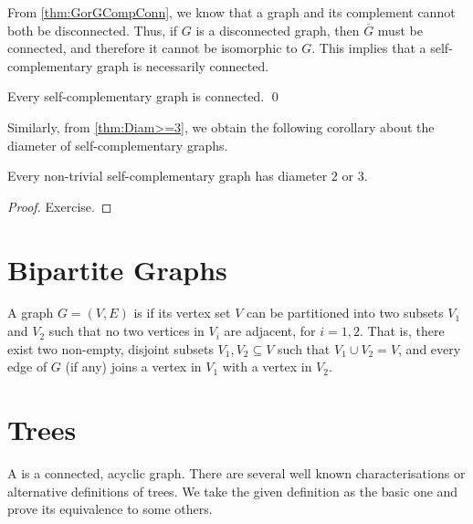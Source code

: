 From \cref{thm:GorGCompConn}, we know that a graph and its complement cannot both be disconnected. Thus, if $G$ is a disconnected graph, then $\overline G$ must be connected, and therefore it cannot be isomorphic to $G$. This implies that a self-complementary graph is necessarily connected.

\begin{Corollary}\label{cor:SCConn}
Every self-complementary graph is connected. \qed
\end{Corollary}

Similarly, from \cref{thm:Diam>=3}, we obtain the following corollary about the diameter of self-complementary graphs.

\begin{Corollary}
Every non-trivial self-complementary graph has diameter $2$ or $3$.
\end{Corollary}

\begin{proof}
Exercise.
\end{proof}

\section{Bipartite Graphs}\label{sec:Bipartite}

A graph $G = (V, E)$ is  if its vertex set $V$ can be partitioned into two subsets $V_1$ and $V_2$ such that no two vertices in $V_i$ are adjacent, for $i = 1, 2$. That is, there exist two non-empty, disjoint subsets $V_1, V_2 \subseteq V$ such that $V_1 \cup V_2 = V$, and every edge of $G$ (if any) joins a vertex in $V_1$ with a vertex in $V_2$.


\section{Trees}\label{sec:Trees}

A  is a connected, acyclic graph. There are several well known characterisations or alternative definitions of trees. We take the given definition as the basic one and prove its equivalence to some others.

